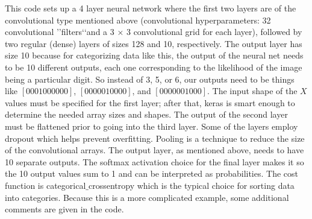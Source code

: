 \documentclass{book}
\theoremstyle{plain}
\theoremstyle{definition}
\numberwithin{exm}{chapter}
\theoremstyle{remark}
\theoremstyle{summary}
\theoremstyle{overview}
\begin{document}
This code sets up a 4 layer neural network where the first two layers are
of the convolutional type mentioned above (convolutional hyperparameters:
32 convolutional \rq\rq filters\lq\lq and a 3 × 3 convolutional grid for each layer), followed by two regular (dense) layers of sizes 128 and 10, respectively. The output layer has size 10 because for categorizing data like this, the output of the
neural net needs to be 10 different outputs, each one corresponding to the likelihood of the image being a particular digit. So instead of 3, 5, or 6, our outputs
need to be things like $[0 0 0 1 0 0 0 0 0 0]$, $[0 0 0 0 0 1 0 0 0 0]$, and
$[0 0 0 0 0 0 1 0 0 0]$.
The input shape of the $X$ values must be specified for the first layer; after that, keras is smart enough to determine the needed array sizes and shapes. The output of the second layer must be flattened prior to going into the third layer. Some of the layers employ dropout which helps prevent overfitting. Pooling is a technique to reduce the size of the convolutional arrays. The output layer, as mentioned above, needs to have 10 separate outputs. The softmax activation choice for the final layer makes it so the 10 output values sum to 1 and can be interpreted as probabilities. The cost function is categorical$\_$crossentropy which is the typical choice for sorting data into categories. Because this is a more complicated example, some additional comments are given in the code.
\end{document}

